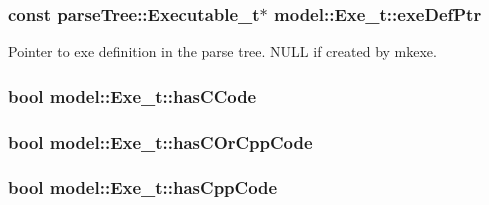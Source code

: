 \subsubsection[{\texorpdfstring{exe\+Def\+Ptr}{exeDefPtr}}]{\setlength{\rightskip}{0pt plus 5cm}const {\bf parse\+Tree\+::\+Executable\+\_\+t}$\ast$ model\+::\+Exe\+\_\+t\+::exe\+Def\+Ptr}\hypertarget{structmodel_1_1_exe__t_a8707e5e8ad70296c920168a4998cd146}{}\label{structmodel_1_1_exe__t_a8707e5e8ad70296c920168a4998cd146}
Pointer to exe definition in the parse tree. N\+U\+LL if created by mkexe. 
\subsubsection[{\texorpdfstring{has\+C\+Code}{hasCCode}}]{\setlength{\rightskip}{0pt plus 5cm}bool model\+::\+Exe\+\_\+t\+::has\+C\+Code}\hypertarget{structmodel_1_1_exe__t_a415002bec6af6a5f70c51515872aa1d2}{}\label{structmodel_1_1_exe__t_a415002bec6af6a5f70c51515872aa1d2}
\subsubsection[{\texorpdfstring{has\+C\+Or\+Cpp\+Code}{hasCOrCppCode}}]{\setlength{\rightskip}{0pt plus 5cm}bool model\+::\+Exe\+\_\+t\+::has\+C\+Or\+Cpp\+Code}\hypertarget{structmodel_1_1_exe__t_a8791215d2a17f2dd4fcc9c6923651360}{}\label{structmodel_1_1_exe__t_a8791215d2a17f2dd4fcc9c6923651360}
\subsubsection[{\texorpdfstring{has\+Cpp\+Code}{hasCppCode}}]{\setlength{\rightskip}{0pt plus 5cm}bool model\+::\+Exe\+\_\+t\+::has\+Cpp\+Code}\hypertarget{structmodel_1_1_exe__t_ac5e22047ea90e57bece65c6176514103}{}\label{structmodel_1_1_exe__t_ac5e22047ea90e57bece65c6176514103}
